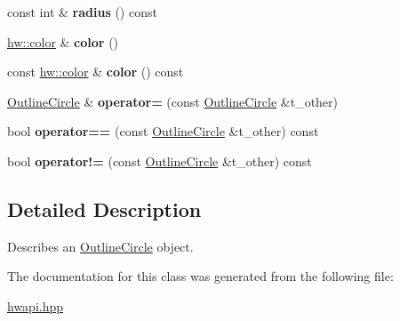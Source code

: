 \begin{DoxyCompactItemize}
\item 
\mbox{\label{classdummy__api_1_1OutlineCircle_a0c565c8163a48ad85508c359502d1d37}} 
const int \& {\bfseries radius} () const
\item 
\mbox{\label{classdummy__api_1_1OutlineCircle_a3b26df528f7aa33939ed8864b15cba46}} 
\mbox{\hyperlink{structhw_1_1color}{hw\+::color}} \& {\bfseries color} ()
\item 
\mbox{\label{classdummy__api_1_1OutlineCircle_af5490b84dfb63facfce2ef8187410446}} 
const \mbox{\hyperlink{structhw_1_1color}{hw\+::color}} \& {\bfseries color} () const
\item 
\mbox{\label{classdummy__api_1_1OutlineCircle_ad742f4c3b261c0f2344b62d68cf654ac}} 
\mbox{\hyperlink{classdummy__api_1_1OutlineCircle}{Outline\+Circle}} \& {\bfseries operator=} (const \mbox{\hyperlink{classdummy__api_1_1OutlineCircle}{Outline\+Circle}} \&t\+\_\+other)
\item 
\mbox{\label{classdummy__api_1_1OutlineCircle_a4349b28312a92884a6e4a843d451ad3b}} 
bool {\bfseries operator==} (const \mbox{\hyperlink{classdummy__api_1_1OutlineCircle}{Outline\+Circle}} \&t\+\_\+other) const
\item 
\mbox{\label{classdummy__api_1_1OutlineCircle_a29f8928c35a9d1fa6bb4b632e0fd0817}} 
bool {\bfseries operator!=} (const \mbox{\hyperlink{classdummy__api_1_1OutlineCircle}{Outline\+Circle}} \&t\+\_\+other) const
\end{DoxyCompactItemize}


\subsection{Detailed Description}
Describes an \mbox{\hyperlink{classdummy__api_1_1OutlineCircle}{Outline\+Circle}} object. 

The documentation for this class was generated from the following file\+:\begin{DoxyCompactItemize}
\item 
\mbox{\hyperlink{hwapi_8hpp}{hwapi.\+hpp}}\end{DoxyCompactItemize}

